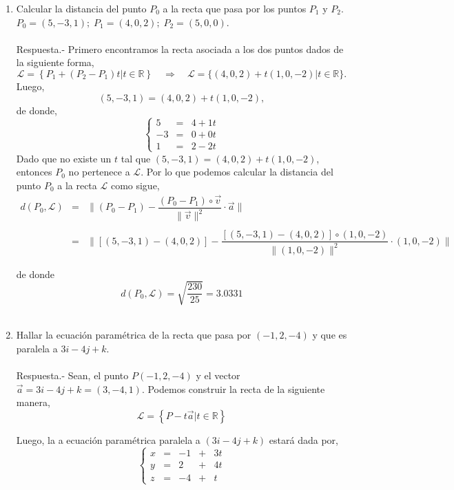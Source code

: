\begin{enumerate}
    \item Calcular la distancia del punto $P_0$ a la recta que pasa por los puntos $P_1$ y $P_2$.\\ $P_0 = (5,-3,1); \; P_1=(4,0,2);\; P_2=(5,0,0)$.\\\\
    Respuesta.-\; Primero encontramos la recta asociada a los dos puntos dados de la siguiente forma, $$\mathscr{L} = \left\{P_1 +(P_2-P_1)t | t \in \mathbb{R}\right\} \quad \Rightarrow \quad \mathscr{L} = \lbrace (4,0,2) + t(1,0,-2) | t \in \mathbb{R} \rbrace.$$
    Luego,
    $$(5,-3,1)=(4,0,2)+t(1,0,-2),$$
    de donde,
    $$\left\{\begin{array}{rcl}
	5&=&4+1t\\
	-3&=&0+0t\\
	1&=&2-2t
    \end{array}\right.$$
    Dado que no existe un $t$ tal que $(5,-3,1)=(4,0,2)+t(1,0,-2)$, entonces $P_0$ no pertenece a $\mathscr{L}$. Por lo que podemos calcular la distancia del punto $P_0$ a la recta $\mathscr{L}$ como sigue, 
    $$\begin{array}{rcl}
	d(P_0,\mathscr{L}) &=& \bigg\| (P_0 - P_1) - \dfrac{(P_0-P_1)\circ \vec{v}}{\|\vec{v}\|^2}\cdot \vec{a}\bigg\| \\\\
			   &=& \bigg\| [(5,-3,1)-(4,0,2)] - \dfrac{\left[(5,-3,1)-(4,0,2)\right]\circ (1,0,-2)}{\|(1,0,-2)\|^2} \cdot (1,0,-2)\bigg\|
    \end{array}$$

	    de donde $$d(P_0,\mathcal{L}) = \sqrt{\dfrac{230}{25}} = 3.0331$$\\

    \item Hallar la ecuación paramétrica de la recta que pasa por $(-1,2,-4)$ y que es paralela a $3i-4j+k$.\\\\
	Respuesta.-\; Sean, el punto $P(-1,2,-4)$ y el vector $\vec{a}=3i-4j+k=(3,-4,1)$. Podemos construir la recta de la siguiente manera,
	$$\mathscr{L}=\left\{P-t\vec{a} | t\in \mathbb{R}\right\}$$

	Luego, la a ecuación paramétrica paralela a $(3i-4j+k)$ estará dada por,
	$$\left\{\begin{array}{rcrcr}
		x &=& -1 &+& 3t\\
		y &=& 2 &+& 4t\\
		z &=& -4 &+& t
	\end{array}\right.$$
	\vspace{0.5cm}


\end{enumerate}
